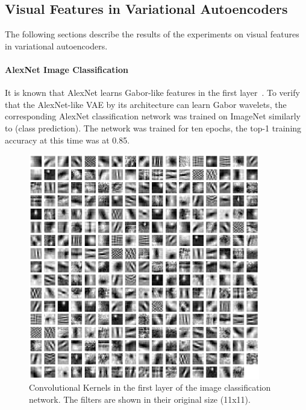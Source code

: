 \subsection{Visual Features in Variational Autoencoders}\label{subsec:results_visual_features_in_variational_autoencoders}
The following sections describe the results of the experiments on visual features in variational autoencoders.

\paragraph{AlexNet Image Classification}
It is known that AlexNet learns Gabor-like features in the first layer~\citep{krizhevsky2012imagenet}.
To verify that the AlexNet-like \ac{VAE} by its architecture can learn Gabor wavelets, the corresponding AlexNet classification network was trained on ImageNet similarly to \citet{krizhevsky2012imagenet} (class prediction).
The network was trained for ten epochs, the top-1 training accuracy at this time was at 0.85.

\begin{figure}
    \centering
    \includegraphics[width=0.9\textwidth]{images/alexnet_classification_l1_kernels.png}
    \caption[Image classification - Layer 1 Kernels]{Convolutional Kernels in the first layer of the image classification network. The filters are shown in their original size (11x11).}
    \label{fig:classification_layer1_kernels}
\end{figure}

